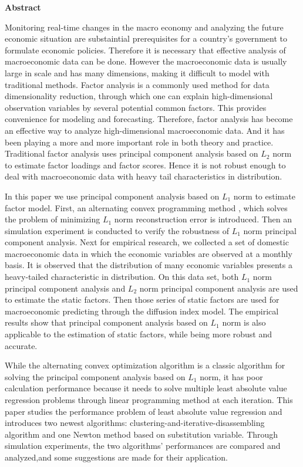 \centerline{\large\bf Abstract}
\vspace{2ex}
Monitoring real-time changes in the macro economy and analyzing 
the future economic situation are substaintial prerequisites for 
a country's government to formulate economic policies.
Therefore it is necessary that effective analysis of macroeconomic data can be done. 
However the macroeconomic data is usually large in scale
and has many dimensions, making it difficult to model with traditional methods.
Factor analysis is a commonly used method for data dimensionality reduction, through which
one can explain high-dimensional observation variables by several potential common factors.
This provides convenience for modeling and forecasting.
Therefore, factor analysis has become an effective way to analyze 
high-dimensional macroeconomic data. And it has been playing a more and more
 important role in both theory and practice.
 Traditional factor analysis uses principal component analysis based 
 on $L_2$ norm to estimate factor loadings and factor scores. Hence it is not robust enough
  to deal with
macroeconomic data with heavy tail characteristics in distribution.

\thispagestyle{plain}
In this paper we use principal component analysis based on $L_1$ norm to 
estimate factor model. First, an alternating convex programming method , which solves 
the problem of minimizing $L_1$ norm reconstruction error 
is introduced. Then an simulation experiment is conducted to verify the robustness of $L_1$ norm
principal component analysis. 
Next for empirical research, we collected a set of
domestic macroeconomic data in which the economic variables are observed at a monthly basis.
It is observed that the distribution of many economic variables presents a heavy-tailed characteristic 
in distribution.
On this data set, both
$L_1$ norm principal component analysis and $L_2$ 
norm principal component analysis are used to estimate the static factors. Then 
those series of static factors are used for macroeconomic predicting through the diffusion index model.
The empirical results show that principal component analysis based on
$L_1$ norm is also applicable to the estimation of static factors, 
while being more robust and accurate.

While the alternating convex optimization algorithm is a classic 
algorithm for solving the principal component analysis based on $L_1$ norm, it has 
poor calculation performance because it
needs to solve multiple least absolute value regression 
problems through linear programming method at each iteration.
This paper studies the performance problem of least absolute 
value regression and introduces two newest algorithms: 
clustering-and-iterative-disassembling algorithm and
one Newton method based on substitution variable. 
Through simulation experiments, the two algorithms' performances
are compared and analyzed,and some suggestions are made for their application.

